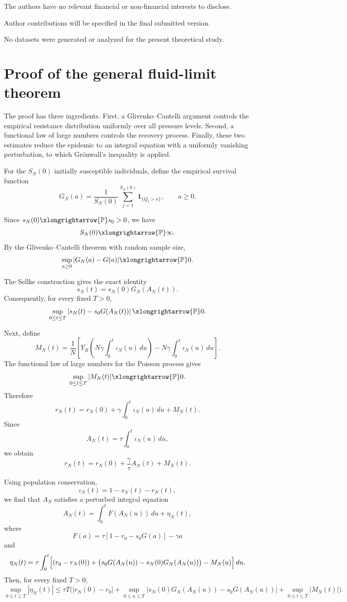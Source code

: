 \documentclass[pdflatex,sn-mathphys-ay]{sn-jnl}
\theoremstyle{thmstyleone}
\theoremstyle{thmstyletwo}
\theoremstyle{thmstylethree}
\newcommand{\Pp}{\mathbb{P}}
\newcommand{\ind}{\mathbf{1}}
\begin{document}
The authors have no relevant financial or non-financial interests to disclose.

Author contributions will be specified in the final submitted version.

No datasets were generated or analyzed for the present theoretical study.

% 



\appendix

\section{Proof of the general fluid-limit theorem}
\label{app:general-proof}


The proof has three ingredients. First, a Glivenko--Cantelli argument controls
the empirical resistance distribution uniformly over all pressure levels.
Second, a functional law of large numbers controls the recovery process.
Finally, these two estimates reduce the epidemic to an integral equation
with a uniformly vanishing perturbation, to which Gr\"onwall's inequality is
applied.

For the \(S_N(0)\) initially susceptible individuals, define the empirical
survival function
\[
G_N(a)
=
\frac{1}{S_N(0)}
\sum_{j=1}^{S_N(0)}
\ind_{\{Q_j>a\}},
\qquad a\geq 0.
\]

Since \(s_N(0)\xlongrightarrow{\Pp}s_0>0\), we have
\[
S_N(0)\xlongrightarrow{\Pp}\infty.
\]
By the Glivenko--Cantelli theorem with random sample size,
\[
\sup_{a\geq 0}|G_N(a)-G(a)|
\xlongrightarrow{\Pp}0.
\]

The Sellke construction gives the exact identity
\[
s_N(t)=s_N(0)G_N(A_N(t)).
\]
Consequently, for every fixed \(T>0\),
\[
\sup_{0\leq t\leq T}
\left|
s_N(t)-s_0G(A_N(t))
\right|
\xlongrightarrow{\Pp}0.
\]

Next, define
\[
M_N(t)
=
\frac{1}{N}
\left[
Y_R\left(
N\gamma\int_0^t\iota_N(u)\,du
\right)
-
N\gamma\int_0^t\iota_N(u)\,du
\right].
\]
The functional law of large numbers for the Poisson process gives
\[
\sup_{0\leq t\leq T}|M_N(t)|
\xlongrightarrow{\Pp}0.
\]
Therefore
\[
r_N(t)
=
r_N(0)+
\gamma\int_0^t\iota_N(u)\,du+M_N(t).
\]
Since
\[
A_N(t)=\tau\int_0^t\iota_N(u)\,du,
\]
we obtain
\[
r_N(t)
=
r_N(0)+\frac{\gamma}{\tau}A_N(t)+M_N(t).
\]

Using population conservation,
\[
\iota_N(t)=1-s_N(t)-r_N(t),
\]
we find that \(A_N\) satisfies a perturbed integral equation
\[
A_N(t)
=
\int_0^t F(A_N(u))\,du+\eta_N(t),
\]
where
\[
F(a)
=
\tau[1-r_0-s_0G(a)]-\gamma a
\]
and
\[
\eta_N(t)
=
\tau\int_0^t
\Bigl[
(r_0-r_N(0))
+
\bigl(
s_0G(A_N(u))
-
s_N(0)G_N(A_N(u))
\bigr)
-
M_N(u)
\Bigr]\,du .
\]
Then, for every fixed \(T>0\),
\begin{equation*}
\sup_{0\le t\le T}|\eta_N(t)| 
\le
\tau T
\Biggl(
|r_N(0)-r_0|
+
\sup_{0\le u\le T}
\left|
s_N(0)G_N(A_N(u))
-
s_0G(A_N(u))
\right|
+
\sup_{0\leq t\leq T}|M_N(t)|
\Biggr).
\end{equation*}
\end{document}
